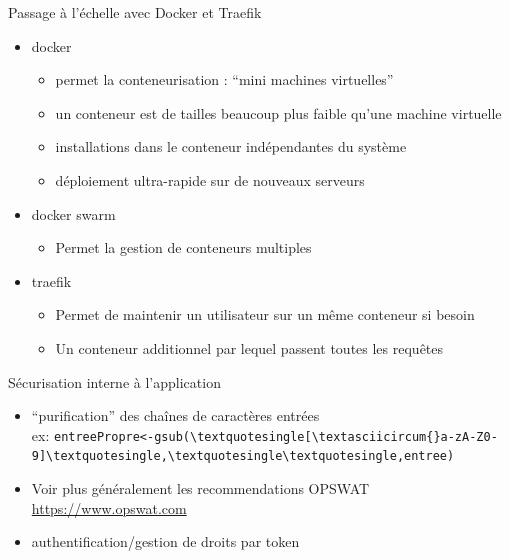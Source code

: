 \documentclass[pdftex,xcolor={table}]{beamer} %
\begin{document}
  \begin{frame}{Passage à l'échelle avec Docker et Traefik}
    \begin{itemize}
      \item docker
        \begin{itemize}
          \item permet la conteneurisation : ``mini machines virtuelles''
          \item un conteneur est de tailles beaucoup plus faible qu'une machine virtuelle
          \item installations dans le conteneur indépendantes du système
          \item déploiement ultra-rapide sur de nouveaux serveurs
        \end{itemize}
      \item docker swarm \\
        \begin{itemize}
          \item Permet la gestion de conteneurs multiples 
        \end{itemize}
      \item traefik 
        \begin{itemize}
          \item Permet de maintenir un utilisateur sur un même conteneur si besoin
          \item Un conteneur additionnel par lequel passent toutes les requêtes
        \end{itemize}
    \end{itemize}
  \end{frame}
  \begin{frame}{Sécurisation interne à l'application}
    \begin{itemize}
      \item ``purification'' des chaînes de caractères entrées\\
        ex: \Verb+entreePropre<-gsub(\textquotesingle[\textasciicircum{}a-zA-Z0-9]\textquotesingle,\textquotesingle\textquotesingle,entree)+
      \item Voir plus généralement les recommendations OPSWAT \url{https://www.opswat.com}
      \item authentification/gestion de droits par token
    \end{itemize}
  \end{frame}
\end{document}
